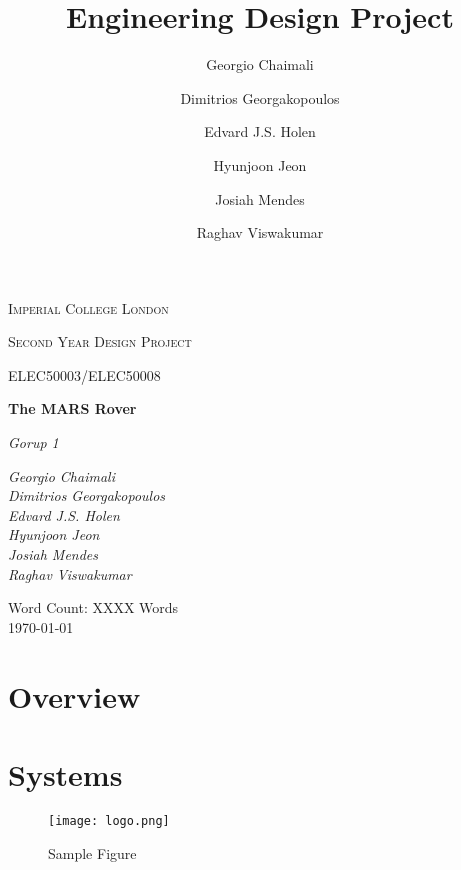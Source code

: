 \documentclass[a4paper, table]{article}
\title{Engineering Design Project}
\author{Georgio Chaimali \and Dimitrios Georgakopoulos \and Edvard J.S. Holen 
        \and Hyunjoon Jeon \and Josiah Mendes \and Raghav Viswakumar}
\begin{document}
 
\begin{titlepage}
    \setlength{\headheight}{66.89pt}
    \thispagestyle{fancy}
    \renewcommand{\headrulewidth}{0pt}
    \renewcommand{\footrulewidth}{0pt}
    \cfoot{} %
    \hbox{}\vfill
    \begin{center} 
	    {\scshape\LARGE Imperial College London  \par}
	    \vspace{1cm}
        {\scshape\Large Second Year Design Project\par}
        \vspace{0.25cm}
        {\scshape\Large ELEC50003/ELEC50008\par}
        \vspace{1.5cm}
        {\huge\bfseries The MARS Rover\par}
        \vspace{2cm}
        {\Large\itshape Gorup 1\par}
        \vfill
        \begin{flushright}
            \textsl{ \large
            Georgio Chaimali \\ Dimitrios Georgakopoulos \\ Edvard J.S. Holen 
            \\ Hyunjoon Jeon \\ Josiah Mendes \\ Raghav Viswakumar
            }
        \end{flushright}
        \vfill

        {\large Word Count: XXXX Words \\ \today\par}
    \end{center}
\end{titlepage}
 

\tableofcontents

\newpage

\section{Overview}

\section{Systems}

\begin{figure}[H]
\centering
\texttt{[image: logo.png]}
\caption{Sample Figure}
\label{fig:image1}
\end{figure}
\end{document}
